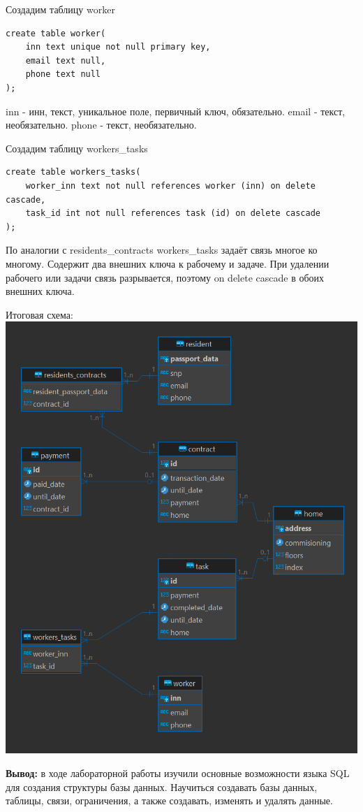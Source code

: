 \documentclass[a4paper,14pt]{extarticle}
\begin{document}
\begin{enumerate}[1.]
Создадим таблицу worker
\begin{verbatim}
create table worker(
    inn text unique not null primary key,
    email text null,
    phone text null
);
\end{verbatim}
inn - инн, текст, уникальное поле, первичный ключ, обязательно.
email - текст, необязательно.
phone - текст, необязательно.

Создадим таблицу workers\_tasks
\begin{verbatim}
create table workers_tasks(
    worker_inn text not null references worker (inn) on delete cascade,
    task_id int not null references task (id) on delete cascade
);
\end{verbatim}
По аналогии с residents\_contracts workers\_tasks задаёт 
связь многое ко многому. Содержит два внешних ключа к рабочему и задаче.
При удалении рабочего или задачи связь разрывается, поэтому on delete cascade 
в обоих внешних ключа.\bigbreak

Итоговая схема:\\
\includegraphics[width=140mm]{schema}
\end{enumerate}

\textbf{Вывод: } в ходе лабораторной работы изучили основные возможности языка SQL для создания 
структуры базы данных. Научиться создавать базы данных, таблицы, связи, 
ограничения, а также создавать, изменять и удалять данные. 
\end{document}

